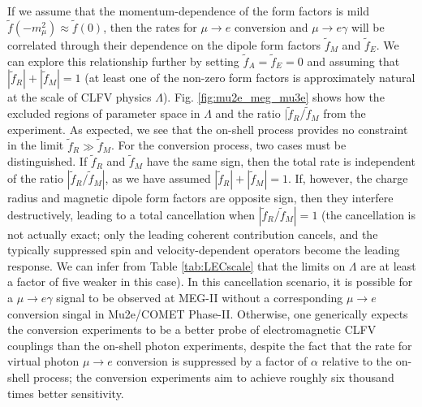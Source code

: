 \documentclass{book}[12pt]
\begin{document}
If we assume that the momentum-dependence of the form factors is mild $\tilde{f}(-m_{\mu}^2)\approx \tilde{f}(0)$, then the rates for $\mu\rightarrow e$ conversion and $\mu\rightarrow e\gamma$ will be correlated through their dependence on the dipole form factors $\tilde{f}_M$ and $\tilde{f}_E$. We can explore this relationship further by setting $\tilde{f}_A=\tilde{f}_E=0$ and assuming that $|\tilde{f}_R|+|\tilde{f}_M|=1$ (at least one of the non-zero form factors is approximately natural at the scale of CLFV physics $\Lambda$). Fig. \ref{fig:mu2e_meg_mu3e} shows how the excluded regions of parameter space in $\Lambda$ and the ratio $|\tilde{f}_R/\tilde{f}_M$ from the experiment. As expected, we see that the on-shell process provides no constraint in the limit $\tilde{f}_R\gg \tilde{f}_M$. For the conversion process, two cases must be distinguished. If $\tilde{f}_R$ and $\tilde{f}_M$ have the same sign, then the total rate is independent of the ratio $|\tilde{f}_R/\tilde{f}_M|$, as we have assumed $|\tilde{f}_R|+|\tilde{f}_M|=1$. If, however, the charge radius and magnetic dipole form factors are opposite sign, then they interfere destructively, leading to a total cancellation when $|\tilde{f}_R/\tilde{f}_M|=1$ (the cancellation is not actually exact; only the leading coherent contribution cancels, and the typically suppressed spin and velocity-dependent operators become the leading response. We can infer from Table \ref{tab:LECscale} that the limits on $\Lambda$ are at least a factor of five weaker in this case). In this cancellation scenario, it is possible for a $\mu\rightarrow e\gamma$ signal to be observed at MEG-II without a corresponding $\mu\rightarrow e$ conversion singal in Mu2e/COMET Phase-II. Otherwise, one generically expects the conversion experiments to be a better probe of electromagnetic CLFV couplings than the on-shell photon experiments, despite the fact that the rate for virtual photon $\mu\rightarrow e$ conversion is suppressed by a factor of $\alpha$ relative to the on-shell process; the conversion experiments aim to achieve roughly six thousand times better sensitivity.
\end{document}
